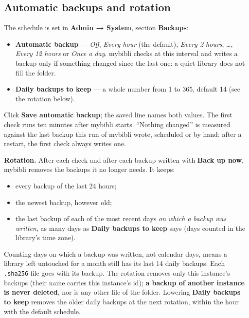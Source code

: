 \subsection*{Automatic backups and rotation}
\label{sec:backups-schedule}

The schedule is set in \textbf{Admin → System}, section
\textbf{Backups}:

\begin{itemize}
  \item \textbf{Automatic backup} --- \emph{Off}, \emph{Every hour}
        (the default), \emph{Every 2 hours}, \dots, \emph{Every 12
        hours} or \emph{Once a day}. mybibli checks at this interval
        and writes a backup only if something changed since the last
        one: a quiet library does not fill the folder.
  \item \textbf{Daily backups to keep} --- a whole number from 1 to
        365, default 14 (see the rotation below).
\end{itemize}

Click \textbf{Save automatic backup}; the saved line names both values.
The first check runs ten minutes after mybibli starts. ``Nothing
changed'' is measured against the last backup this run of mybibli
wrote, scheduled or by hand: after a restart, the first check always
writes one.

\textbf{Rotation.} After each check and after each backup written with
\textbf{Back up now}, mybibli removes the backups it no longer needs.
It keeps:
\begin{itemize}
  \item every backup of the last 24 hours;
  \item the newest backup, however old;
  \item the last backup of each of the most recent days \emph{on which
        a backup was written}, as many days as \textbf{Daily backups to
        keep} says (days counted in the library's time zone).
\end{itemize}
Counting days on which a backup was written, not calendar days, means
a library left untouched for a month still has its last 14 daily
backups. Each \texttt{.sha256} file goes with its backup. The rotation
removes only this instance's backups (their name carries this
instance's id); \textbf{a backup of another instance is never deleted}, nor is any other file of the
folder. Lowering \textbf{Daily backups to keep} removes the older
daily backups at the next rotation, within the hour with the default
schedule.

